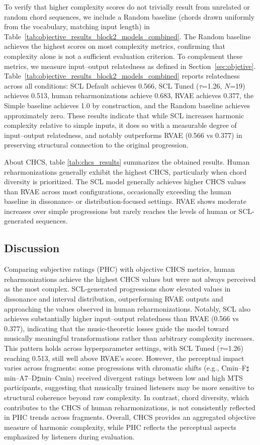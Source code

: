 \documentclass[conference]{IEEEtran}
\begin{document}
To verify that higher complexity scores do not trivially result from unrelated or random chord sequences, we include a Random baseline (chords drawn uniformly from the vocabulary, matching input length) in Table~\ref{tab:objective_results_block2_models_combined}. The Random baseline achieves the highest scores on most complexity metrics, confirming that complexity alone is not a sufficient evaluation criterion. To complement these metrics, we measure input--output relatedness as defined in Section~\ref{sec:objetive}. Table~\ref{tab:objective_results_block2_models_combined} reports relatedness across all conditions: SCL Default achieves 0.566, SCL Tuned ($\tau$=1.26, $N$=19) achieves 0.513, human reharmonizations achieve 0.683, RVAE achieves 0.377, the Simple baseline achieves 1.0 by construction, and the Random baseline achieves approximately zero. These results indicate that while SCL increases harmonic complexity relative to simple inputs, it does so with a measurable degree of input--output relatedness, and notably outperforms RVAE (0.566 vs 0.377) in preserving structural connection to the original progression.


About CHCS, table \ref{tab:chcs_results} summarizes the obtained results. Human reharmonizations generally exhibit the highest CHCS, particularly when chord diversity is prioritized. The SCL model generally achieves higher CHCS values than RVAE across most configurations, occasionally exceeding the human baseline in dissonance- or distribution-focused settings. RVAE shows moderate increases over simple progressions but rarely reaches the levels of human or SCL-generated sequences.
\subsection{Discussion}

Comparing subjective ratings (PHC) with objective CHCS metrics, human reharmonizations achieve the highest CHCS values but were not always perceived as the most complex. SCL-generated progressions show elevated values in dissonance and interval distribution, outperforming RVAE outputs and approaching the values observed in human reharmonizations. Notably, SCL also achieves substantially higher input--output relatedness than RVAE (0.566 vs 0.377), indicating that the music-theoretic losses guide the model toward musically meaningful transformations rather than arbitrary complexity increases. This pattern holds across hyperparameter settings, with SCL Tuned ($\tau$=1.26) reaching 0.513, still well above RVAE's score. However, the perceptual impact varies across fragments: some progressions with chromatic shifts (e.g., Cmin--F$\sharp$min--A7--D$\sharp$min--Cmin) received divergent ratings between low and high MTS participants, suggesting that musically trained listeners may be more sensitive to structural coherence beyond raw complexity. In contrast, chord diversity, which contributes to the CHCS of human reharmonizations, is not consistently reflected in PHC trends across fragments. Overall, CHCS provides an aggregated objective measure of harmonic complexity, while PHC reflects the perceptual aspects emphasized by listeners during evaluation.
\end{document}
